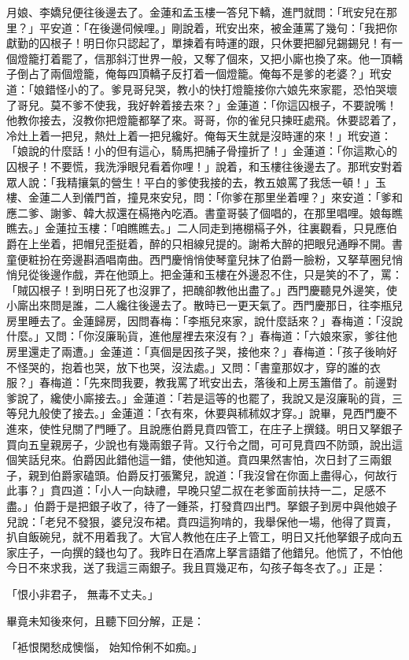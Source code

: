 \begin{showcontents}{}
月娘、李嬌兒便往後邊去了。金蓮和孟玉樓一答兒下轎，進門就問：「玳安兒在那里？」平安道：「在後邊伺候哩。」剛說着，玳安出來，被金蓮罵了幾句：「我把你獻勤的囚根子！明日你只認起了，單揀着有時運的跟，只休要把腳兒錫錫兒！有一個燈籠打着罷了，信那斜汀世界一般，又奪了個來，又把小廝也換了來。他一頂轎子倒占了兩個燈籠，俺每四頂轎子反打着一個燈籠。俺每不是爹的老婆？」玳安道：「娘錯怪小的了。爹見哥兒哭，教小的快打燈籠接你六娘先來家罷，恐怕哭壞了哥兒。莫不爹不使我，我好幹着接去來？」金蓮道：「你這囚根子，不要說嘴！他教你接去，沒教你把燈籠都拏了來。哥哥，你的雀兒只揀旺處飛。休要認着了，冷灶上着一把兒，熱灶上着一把兒纔好。俺每天生就是沒時運的來！」玳安道：「娘說的什麼話！小的但有這心，騎馬把脯子骨撞折了！」金蓮道：「你這欺心的囚根子！不要慌，我洗淨眼兒看着你哩！」說着，和玉樓往後邊去了。那玳安對着眾人說：「我精攘氣的營生！平白的爹使我接的去，教五娘罵了我恁一頓！」玉樓、金蓮二人到儀門首，撞見來安兒，問：「你爹在那里坐着哩？」來安道：「爹和應二爹、謝爹、韓大叔還在槅捲內吃酒。書童哥裝了個唱的，在那里唱哩。娘每瞧瞧去。」金蓮拉玉樓：「咱瞧瞧去。」二人同走到捲棚槅子外，往裏觀看，只見應伯爵在上坐着，把帽兒歪挺着，醉的只相線兒提的。謝希大醉的把眼兒通睜不開。書童便粧扮在旁邊斟酒唱南曲。西門慶悄悄使琴童兒抹了伯爵一臉粉，又拏草圈兒悄悄兒從後邊作戲，弄在他頭上。把金蓮和玉樓在外邊忍不住，只是笑的不了，罵：「賊囚根子！到明日死了也沒罪了，把醜卻教他出盡了。」西門慶聽見外邊笑，使小廝出來問是誰，二人纔往後邊去了。散時已一更天氣了。西門慶那日，往李瓶兒房里睡去了。金蓮歸房，因問春梅：「李瓶兒來家，說什麼話來？」春梅道：「沒說什麼。」又問：「你沒廉恥貨，進他屋裡去來沒有？」春梅道：「六娘來家，爹往他房里還走了兩遭。」金蓮道：「真個是因孩子哭，接他來？」春梅道：「孩子後晌好不怪哭的，抱着也哭，放下也哭，沒法處。」又問：「書童那奴才，穿的誰的衣服？」春梅道：「先來問我要，教我罵了玳安出去，落後和上房玉簫借了。前邊對爹說了，纔使小廝接去。」金蓮道：「若是這等的也罷了，我說又是沒廉恥的貨，三等兒九般使了接去。」金蓮道：「衣有來，休要與秫秫奴才穿。」說畢，見西門慶不進來，使性兒關了門睡了。且說應伯爵見賁四管工，在庄子上撰錢。明日又拏銀子買向五皇親房子，少說也有幾兩銀子背。又行令之間，可可見賁四不防頭，說出這個笑話兒來。伯爵因此錯他這一錯，使他知道。賁四果然害怕，次日封了三兩銀子，親到伯爵家磕頭。伯爵反打張驚兒，說道：「我沒曾在你面上盡得心，何故行此事？」賁四道：「小人一向缺禮，早晚只望二叔在老爹面前扶持一二，足感不盡。」伯爵于是把銀子收了，待了一鍾茶，打發賁四出門。拏銀子到房中與他娘子兒說：「老兒不發狠，婆兒沒布裙。賁四這狗啃的，我舉保他一場，他得了買賣，扒自飯碗兒，就不用着我了。大官人教他在庄子上管工，明日又托他拏銀子成向五家庄子，一向撰的錢也勾了。我昨日在酒席上拏言語錯了他錯兒。他慌了，不怕他今日不來求我，送了我這三兩銀子。我且買幾疋布，勾孩子每冬衣了。」正是：

「恨小非君子，  無毒不丈夫。」

畢竟未知後來何，且聽下回分解，正是：

「袛恨閑愁成懊惱，  始知伶俐不如痴。」





\end{showcontents}


